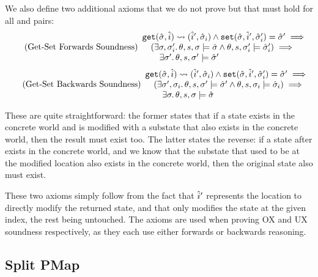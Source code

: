 We also define two additional axioms that we do not prove but that must hold for all  and  pairs:
\begin{equation}
\tag{Get-Set Forwards Soundness}\label{eq:getset-sound}
\begin{array}{l}
\texttt{get}(\hat{\sigma},\hat{i})\rightsquigarrow(\hat{i}', \hat{\sigma}_i) \land \texttt{set}(\hat{\sigma}, \hat{i}', \hat{\sigma}_i')=\hat{\sigma}' \implies \\
\quad (\exists \sigma,\sigma_i'\ldotp \theta,s,\sigma\models\hat{\sigma} \land \theta,s,\sigma_i'\models\hat{\sigma}_i') \implies \\
\qquad \exists \sigma'\ldotp \theta,s,\sigma'\models\hat{\sigma}'
\end{array}
\end{equation}
\begin{equation}
\tag{Get-Set Backwards Soundness}\label{eq:getset-sound}
\begin{array}{l}
\texttt{get}(\hat{\sigma},\hat{i})\rightsquigarrow(\hat{i}', \hat{\sigma}_i) \land \texttt{set}(\hat{\sigma}, \hat{i}', \hat{\sigma}_i')=\hat{\sigma}' \implies \\
\quad (\exists \sigma',\sigma_i\ldotp \theta,s,\sigma'\models\hat{\sigma}' \land \theta,s,\sigma_i\models\hat{\sigma}_i) \implies \\
\qquad \exists \sigma\ldotp \theta,s,\sigma\models\hat{\sigma}
\end{array}
\end{equation}

These are quite straightforward: the former states that if a state exists in the concrete world and is modified with a substate that also exists in the concrete world, then the result must exist too. The latter states the reverse: if a state after  exists in the concrete world, and we know that the substate that used to be at the modified location also exists in the concrete world, then the original state also must exist.

These two axioms simply follow from the fact that $\hat{i}'$ represents the location to directly modify the returned state, and that  only modifies the state at the given index, the rest being untouched. The axioms are used when proving OX and UX soundness respectively, as they each use either forwards or backwards reasoning.

\subsection{Split PMap}

